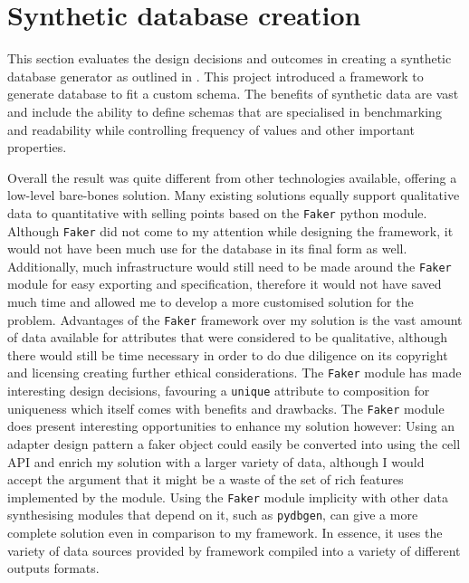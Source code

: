 \section{Synthetic database creation}
This section evaluates the design decisions and outcomes in creating a synthetic
database generator as outlined in . This
project introduced a framework to generate database to fit a custom schema. The
benefits of synthetic data are vast and include the ability to define schemas
that are specialised in benchmarking and readability while controlling frequency
of values and other important properties.

Overall the result was quite different from other technologies available,
offering a low-level bare-bones solution. Many existing solutions equally support
qualitative data to quantitative with selling points based on the
\lstinline{Faker} python module. Although \lstinline{Faker} did not come to my
attention while designing the framework, it would not have been much use for the
 database in its final form as well. Additionally, much
infrastructure would still need to be made around the \lstinline{Faker} module
for easy exporting and specification, therefore it would not have saved much
time and allowed me to develop a more customised solution for the problem.
Advantages of the \lstinline{Faker} framework over my solution is the vast
amount of data available for attributes that were considered to be qualitative,
although there would still be time necessary in order to do due diligence on its
copyright and licensing creating further ethical considerations. The \lstinline{Faker} module has made interesting
design decisions, favouring a \lstinline{unique} attribute to composition for
uniqueness which itself comes with benefits and drawbacks. The \lstinline{Faker}
module does present interesting opportunities to enhance my solution however:
Using an adapter design pattern a faker object could easily be converted into
using the cell API and enrich my solution with a larger variety of data,
although I would accept the argument that it might be a waste of the set of rich
features implemented by the module. Using the \lstinline{Faker} module implicity
with other data synthesising modules that depend on
it, such as \lstinline{pydbgen}, can give a more complete solution even in
comparison to my framework. In essence, it uses the variety of data sources
provided by framework compiled into a variety of different outputs formats.
